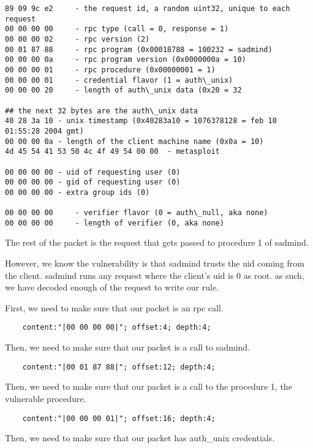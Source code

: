 \documentclass[english]{report}
\begin{document}
\begin{verbatim}
89 09 9c e2     - the request id, a random uint32, unique to each request
00 00 00 00     - rpc type (call = 0, response = 1)
00 00 00 02     - rpc version (2)
00 01 87 88     - rpc program (0x00018788 = 100232 = sadmind)
00 00 00 0a     - rpc program version (0x0000000a = 10)
00 00 00 01     - rpc procedure (0x00000001 = 1)
00 00 00 01     - credential flavor (1 = auth\_unix)
00 00 00 20     - length of auth\_unix data (0x20 = 32

## the next 32 bytes are the auth\_unix data
40 28 3a 10 - unix timestamp (0x40283a10 = 1076378128 = feb 10 01:55:28 2004 gmt)
00 00 00 0a - length of the client machine name (0x0a = 10)
4d 45 54 41 53 50 4c 4f 49 54 00 00  - metasploit

00 00 00 00 - uid of requesting user (0)
00 00 00 00 - gid of requesting user (0)
00 00 00 00 - extra group ids (0)

00 00 00 00     - verifier flavor (0 = auth\_null, aka none)
00 00 00 00     - length of verifier (0, aka none)
\end{verbatim}

The rest of the packet is the request that gets passed to procedure 1 of
sadmind.

However, we know the vulnerability is that sadmind trusts the uid coming from
the client.  sadmind runs any request where the client's uid is 0 as root.  as
such, we have decoded enough of the request to write our rule.  

First, we need to make sure that our packet is an rpc call.
    
\begin{verbatim}
    content:"|00 00 00 00|"; offset:4; depth:4;
\end{verbatim}

Then, we need to make sure that our packet is a call to sadmind.
    
\begin{verbatim}
    content:"|00 01 87 88|"; offset:12; depth:4;
\end{verbatim}

Then, we need to make sure that our packet is a call to the procedure 1, the vulnerable procedure.  
   
\begin{verbatim}
    content:"|00 00 00 01|"; offset:16; depth:4;
\end{verbatim}

Then, we need to make sure that our packet has auth\_unix credentials.  
    
\end{document}
